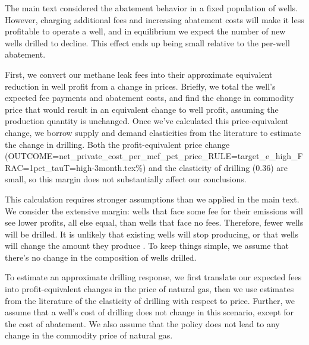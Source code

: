 \documentclass[12pt,oneside,letterpaper]{article}
\theoremstyle{definition}
\begin{document}
\begin{refsection}
The main text considered the abatement behavior in a fixed population of wells.
However, charging additional fees and increasing abatement costs will make it less profitable to operate a well, and in equilibrium we expect the number of new wells drilled to decline.
This effect ends up being small relative to the per-well abatement.

First, we convert our methane leak fees into their approximate equivalent reduction in well profit from a change in prices.
Briefly, we total the well's expected fee payments and abatement costs, and find the change in commodity price that would result in an equivalent change to well profit, assuming the production quantity is unchanged.
Once we've calculated this price-equivalent change, we borrow supply and demand elasticities from the literature to estimate the change in drilling.
Both the profit-equivalent price change
({OUTCOME=net_private_cost_per_mcf_pct_price_RULE=target_e_high_FRAC=1pct_tauT=high-3month.tex}\%)
and the elasticity of drilling (0.36) are small, so this margin does not substantially affect our conclusions.

This calculation requires stronger assumptions than we applied in the main text.
We consider the extensive margin: wells that face some fee for their emissions will see lower profits, all else equal, than wells that face no fees.
Therefore, fewer wells will be drilled.
It is unlikely that existing wells will stop producing, or that wells will change the amount they produce \parencite{Anderson/Kellogg/Salant:2018}.
To keep things simple, we assume that there's no change in the composition of wells drilled.

To estimate an approximate drilling response, we first translate our expected fees into profit-equivalent changes in the price of natural gas, then we use estimates from the literature of the elasticity of drilling with respect to price.
Further, we assume that a well's cost of drilling does not change in this scenario, except for the cost of abatement.
We also assume that the policy does not lead to any change in the commodity price of natural gas.


\end{refsection}
\end{document}
